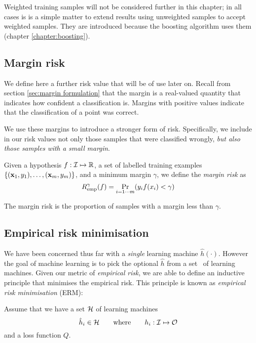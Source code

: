 Weighted training samples will not be considered further in this
chapter; in all cases is is a simple matter to extend results using
unweighted samples to accept weighted samples.  They are introduced
because the boosting algorithm uses them (chapter
\ref{chapter:boosting}).


\subsection{Margin risk}

We define here a further risk value that will be of use later on.
Recall from section \ref{sec:margin formulation} that the margin is a
real-valued quantity that indicates how confident a classification
is.  Margins with positive values indicate that the classification of
a point was correct.

We use these margins to introduce a stronger form of risk.
Specifically, we include in our risk values not only those samples
that were classified wrongly, \emph{but also those samples with a
small margin}. 

\begin{definition}
Given a hypothesis $f : \mathcal{I} \mapsto \mathbb{R}$, a set of
labelled training examples $\{(\mathbf{x}_1, y_1), \ldots, (\mathbf{x}_m, y_m)\}$,
and a minimum margin $\gamma$, we define the \emph{margin risk} as
%
\begin{equation}
R^{\gamma}_{\mathrm{emp}}(f) = \Pr_{i=1\cdots m}(y_i f(x_i) < \gamma)
\end{equation}
\end{definition}

The margin risk is the proportion of samples with a margin less than
$\gamma$.


\subsection{Empirical risk minimisation}

We have been concerned thus far with a \emph{single} learning
machine $\hat{h}(\cdot)$.  However the goal of machine learning is to
pick the optional $\hat{h}$  from a set \calH\ of learning machines.
Given our metric of \emph{empirical risk}, we are able to define an
inductive principle that minimises the empirical risk.  This principle
is known as \emph{empirical risk minimisation} (ERM):

Assume that we have a set $\mathcal{H}$ of learning machines
%
\begin{equation}
\hat{h}_i \in \mathcal{H} \qquad \mbox{where} \qquad h_i : \mathcal{I} \mapsto
\mathcal{O}
\end{equation}
%
and a loss function $Q$.

